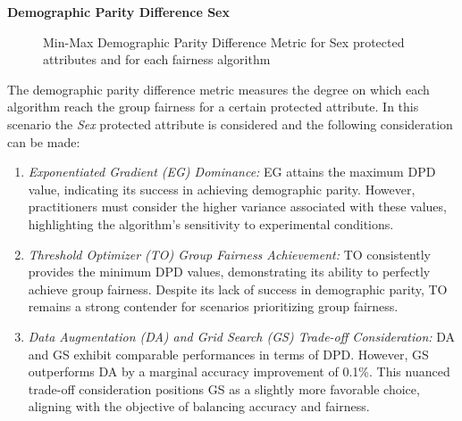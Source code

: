 \newpage
\textbf{Demographic Parity Difference Sex}
\begin{figure}[H]
    \centering
    \caption{Min-Max Demographic Parity Difference Metric for Sex protected attributes and for each fairness algorithm}
\end{figure}

The demographic parity difference metric measures the degree on which each algorithm reach the group fairness for a certain protected attribute. In this scenario the \emph{Sex} protected attribute is considered and the following consideration can be made:

\begin{enumerate}
    \item \emph{Exponentiated Gradient (EG) Dominance:} EG attains the maximum DPD value, indicating its success in achieving demographic parity. However, practitioners must consider the higher variance associated with these values, highlighting the algorithm's sensitivity to experimental conditions.

    \item \emph{Threshold Optimizer (TO) Group Fairness Achievement:} TO consistently provides the minimum DPD values, demonstrating its ability to perfectly achieve group fairness. Despite its lack of success in demographic parity, TO remains a strong contender for scenarios prioritizing group fairness.

    \item \emph{Data Augmentation (DA) and Grid Search (GS) Trade-off Consideration:} DA and GS exhibit comparable performances in terms of DPD. However, GS outperforms DA by a marginal accuracy improvement of 0.1\%. This nuanced trade-off consideration positions GS as a slightly more favorable choice, aligning with the objective of balancing accuracy and fairness.
\end{enumerate}

